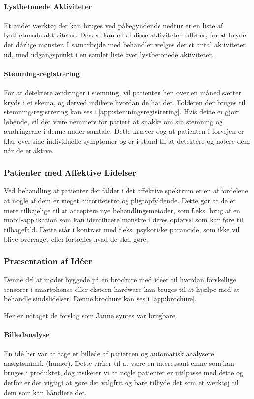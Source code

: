 \paragraph{Lystbetonede Aktiviteter}
Et andet værktøj der kan bruges ved påbegyndende nedtur er en liste af lystbetonede aktiviteter.
Derved kan en af disse aktiviteter udføres, for at bryde det dårlige mønster.
I samarbejde med behandler vælges der et antal aktiviteter ud, med udgangspunkt i en samlet liste over lystbetonede aktiviteter.

\paragraph{Stemningsregistrering}
For at detektere ændringer i stemning, vil patienten hen over en måned sætter kryds i et skema, og derved indikere hvordan de har det.
Folderen der bruges til stemningsregistrering kan ses i \cref{app:stemningsregistrering}.
Hvis dette er gjort løbende, vil det være nemmere for patient at snakke om sin stemning og ændringerne i denne under samtale.
Dette kræver dog at patienten i forvejen er klar over sine individuelle symptomer og er i stand til at detektere og notere dem når de er aktive.

\subsubsection{Patienter med Affektive Lidelser}
Ved behandling af patienter der falder i det affektive spektrum er en af fordelene at nogle af dem er meget autoritetstro og pligtopfyldende.
Dette gør at de er mere tilbøjelige til at acceptere nye behandlingsmetoder, som f.eks. brug af en mobil-applikation som kan identificere mønstre i deres opførsel som kan føre til tilbagefald.
Dette står i kontrast med f.eks. psykotiske paranoide, som ikke vil blive overvåget eller fortælles hvad de skal gøre.

\subsubsection{Præsentation af Idéer}\label{janne_ideer}
Denne del af mødet byggede på en brochure med idéer til hvordan forskellige sensorer i smartphones eller ekstern hardware kan bruges til at hjælpe med at behandle sindslidelser. 
Denne brochure kan ses i \cref{app:brochure}.

Her er udtaget de forslag som Janne syntes var brugbare.

\paragraph{Billedanalyse}
En idé her var at tage et billede af patienten og automatisk analysere ansigtsmimik (humør).
Dette virker til at være en interessant emne som kan bruges i produktet, dog risikerer vi at nogle patienter er utilpasse med dette og derfor er det vigtigt at gøre det valgfrit og bare tilbyde det som et værktøj til dem som kan håndtere det.

